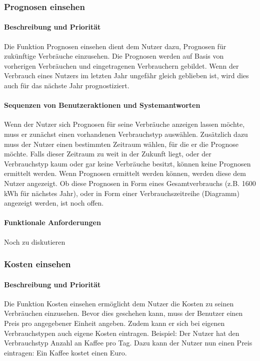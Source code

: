 \subsubsection{Prognosen einsehen}
\paragraph{Beschreibung und Priorität}
Die Funktion Prognosen einsehen dient dem Nutzer dazu, Prognosen für zukünftige Verbräuche einzusehen.
Die Prognosen werden auf Basis von vorherigen Verbräuchen und eingetragenen Verbrauchern gebildet.
Wenn der Verbrauch eines Nutzers im letzten Jahr ungefähr gleich geblieben ist,
wird dies auch für das nächste Jahr prognostiziert.
\paragraph{Sequenzen von Benutzeraktionen und Systemantworten}
Wenn der Nutzer sich Prognosen für seine Verbräuche anzeigen lassen möchte,
muss er zunächst einen vorhandenen Verbrauchstyp auswählen.
Zusätzlich dazu muss der Nutzer einen bestimmten Zeitraum wählen, für die er die Prognose möchte.
Falls dieser Zeitraum zu weit in der Zukunft liegt, oder der Verbrauchstyp kaum oder gar keine Verbräuche besitzt,
können keine Prognosen ermittelt werden.
Wenn Prognosen ermittelt werden können, werden diese dem Nutzer angezeigt.
Ob diese Prognosen in Form eines Gesamtverbrauchs (z.B. 1600 kWh für nächstes Jahr),
oder in Form einer Verbrauchszeitreihe (Diagramm) angezeigt werden, ist noch offen.
\paragraph{Funktionale Anforderungen}
Noch zu diskutieren

\subsubsection{Kosten einsehen}
\paragraph{Beschreibung und Priorität}
Die Funktion Kosten einsehen ermöglicht dem Nutzer die Kosten zu seinen Verbräuchen einzusehen.
Bevor dies geschehen kann, muss der Benutzer einen Preis pro angegebener Einheit angeben.
Zudem kann er sich bei eigenen Verbrauchstypen auch eigene Kosten eintragen.
Beispiel: Der Nutzer hat den Verbrauchstyp Anzahl an Kaffee pro Tag.
Dazu kann der Nutzer nun einen Preis eintragen: Ein Kaffee kostet einen Euro.
